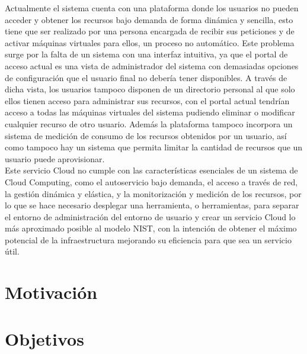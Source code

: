 Actualmente el sistema cuenta con una plataforma donde los usuarios no pueden acceder y obtener los recursos bajo demanda de forma dinámica y sencilla, esto tiene que ser realizado por una persona encargada de recibir sus peticiones y de activar máquinas virtuales para ellos, un proceso no automático. Este problema surge por la falta de un sistema con una interfaz intuitiva, ya que el portal de acceso actual es una vista de administrador del sistema con demasiadas opciones de configuración que el usuario final no debería tener disponibles. A través de dicha vista, los usuarios tampoco disponen de un directorio personal al que solo ellos tienen acceso para administrar sus recursos, con el portal actual tendrían acceso a todas las máquinas virtuales del sistema pudiendo eliminar o modificar cualquier recurso de otro usuario. Además la plataforma tampoco incorpora un sistema de medición de consumo de los recursos obtenidos por un usuario, así como tampoco hay un sistema que permita limitar la cantidad de recursos que un usuario puede aprovisionar.\\

Este servicio Cloud no cumple con las características esenciales de un sistema de Cloud Computing, como el autoservicio bajo demanda, el acceso a través de red, la gestión dinámica y elástica, y la monitorización y medición de los recursos, por lo que se hace necesario desplegar una herramienta, o herramientas, para separar el entorno de administración del entorno de usuario y crear un servicio Cloud lo más aproximado posible al modelo NIST, con la intención de obtener el máximo potencial de la infraestructura mejorando su eficiencia para que sea un servicio útil.



\section{Motivación}


\section{Objetivos}

